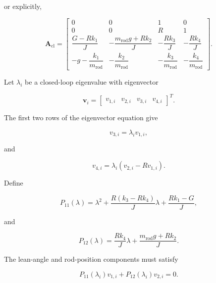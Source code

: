 or explicitly,

\begin{equation}
\mathbf{A}_{\mathrm{cl}}
=
\begin{bmatrix}
0 & 0 & 1 & 0 \\
0 & 0 & R & 1 \\[1mm]
\dfrac{G-Rk_1}{J}
&
-\dfrac{m_{\mathrm{rod}}g+Rk_2}{J}
&
-\dfrac{Rk_3}{J}
&
-\dfrac{Rk_4}{J}
\\[4mm]
-g-\dfrac{k_1}{m_{\mathrm{rod}}}
&
-\dfrac{k_2}{m_{\mathrm{rod}}}
&
-\dfrac{k_3}{m_{\mathrm{rod}}}
&
-\dfrac{k_4}{m_{\mathrm{rod}}}
\end{bmatrix}.
\label{eq:closed-loop-eigenvector-matrix}
\end{equation}

Let $\lambda_i$ be a closed-loop eigenvalue with eigenvector

\begin{equation}
\mathbf{v}_i
=
\begin{bmatrix}
v_{1,i} &
v_{2,i} &
v_{3,i} &
v_{4,i}
\end{bmatrix}^{T}.
\end{equation}

The first two rows of the eigenvector equation give

\begin{equation}
v_{3,i}
=
\lambda_i v_{1,i},
\end{equation}

and

\begin{equation}
v_{4,i}
=
\lambda_i
\left(
v_{2,i}-Rv_{1,i}
\right).
\label{eq:closed-loop-kinematic-eigenvector-relations}
\end{equation}

Define

\begin{equation}
P_{11}(\lambda)
=
\lambda^2
+
\frac{
R(k_3-Rk_4)
}
{J}\lambda
+
\frac{
Rk_1-G
}
{J},
\label{eq:closed-loop-P11}
\end{equation}

and

\begin{equation}
P_{12}(\lambda)
=
\frac{
Rk_4
}
{J}\lambda
+
\frac{
m_{\mathrm{rod}}g+Rk_2
}
{J}.
\label{eq:closed-loop-P12}
\end{equation}

The lean-angle and rod-position components must satisfy

\begin{equation}
P_{11}(\lambda_i)v_{1,i}
+
P_{12}(\lambda_i)v_{2,i}
=
0.
\end{equation}

